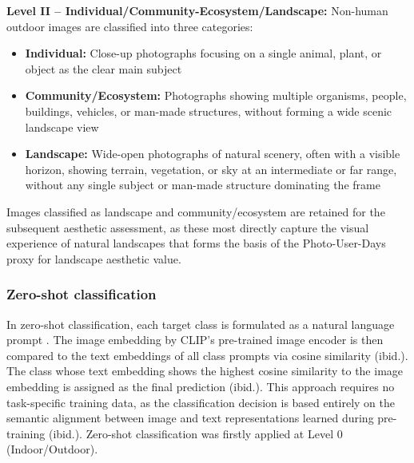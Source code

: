 \documentclass[hidelinks, 11pt]{article}
\begin{document}
\textbf{Level II -- Individual/Community-Ecosystem/Landscape:} Non-human outdoor images are classified into three categories:
\begin{itemize}
\item \textbf{Individual:} Close-up photographs focusing on a single animal, plant, or object as the clear main subject
\item \textbf{Community/Ecosystem:} Photographs showing multiple organisms, people, buildings, vehicles, or man-made structures, without forming a wide scenic landscape view
\item \textbf{Landscape:} Wide-open photographs of natural scenery, often with a visible horizon, showing terrain, vegetation, or sky at an intermediate or far range, without any single subject or man-made structure dominating the frame
\end{itemize}
Images classified as landscape and community/ecosystem are retained for the subsequent aesthetic assessment, as these most directly capture the visual experience of natural landscapes that forms the basis of the Photo-User-Days proxy for landscape aesthetic value.

\subsubsection{Zero-shot classification}
In zero-shot classification, each target class is formulated as a natural language prompt \citep{radford_learning_2021}. The image embedding by CLIP's pre-trained image encoder is then compared to the text embeddings of all class prompts via cosine similarity (ibid.). The class whose text embedding shows the highest cosine similarity to the image embedding is assigned as the final prediction (ibid.). This approach requires no task-specific training data, as the classification decision is based entirely on the semantic alignment between image and text representations learned during pre-training (ibid.). Zero-shot classification was firstly applied at Level 0 (Indoor/Outdoor). 
\end{document}
